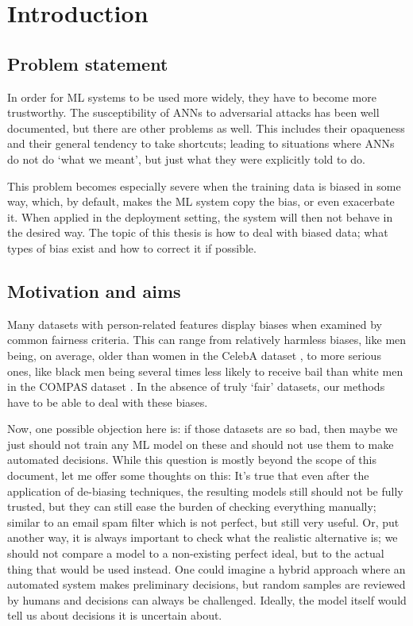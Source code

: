 \chapter{Introduction}\label{ch:introduction}
\section{Problem statement}
In order for \ac{ML} systems to be used more widely,
they have to become more trustworthy.
The susceptibility of \acp{ANN} to adversarial attacks has been well documented, but there are other problems as well.
This includes their opaqueness and their general tendency to take shortcuts;
leading to situations where \acp{ANN} do not do `what we meant', but just what they were explicitly told to do.

This problem becomes especially severe when the training data is biased in some way,
which, by default, makes the \ac{ML} system copy the bias, or even exacerbate it.
When applied in the deployment setting, the system will then not behave in the desired way.
The topic of this thesis is how to deal with biased data;
what types of bias exist and how to correct it if possible.

\section{Motivation and aims}
Many datasets with person-related features display biases when examined by common fairness criteria.
This can range from relatively harmless biases,
like men being, on average, older than women in the CelebA dataset \citep{liu2015faceattributes},
to more serious ones,
like black men being several times less likely to receive bail than white men in the COMPAS dataset \citep{angwin2016machine}.
In the absence of truly `fair' datasets, our methods have to be able to deal with these biases.

Now, one possible objection here is:
if those datasets are so bad,
then maybe we just should not train any \ac{ML} model on these and should not use them to make automated decisions.
While this question is mostly beyond the scope of this document, let me offer some thoughts on this:
It's true that even after the application of de-biasing techniques,
the resulting models still should not be fully trusted,
but they can still ease the burden of checking everything manually;
similar to an email spam filter which is not perfect, but still very useful.
Or, put another way, it is always important to check what the realistic alternative is;
we should not compare a model to a non-existing perfect ideal, but to the actual thing that would be used instead.
One could imagine a hybrid approach where an automated system makes preliminary decisions,
but random samples are reviewed by humans and decisions can always be challenged.
Ideally, the model itself would tell us about decisions it is uncertain about.

